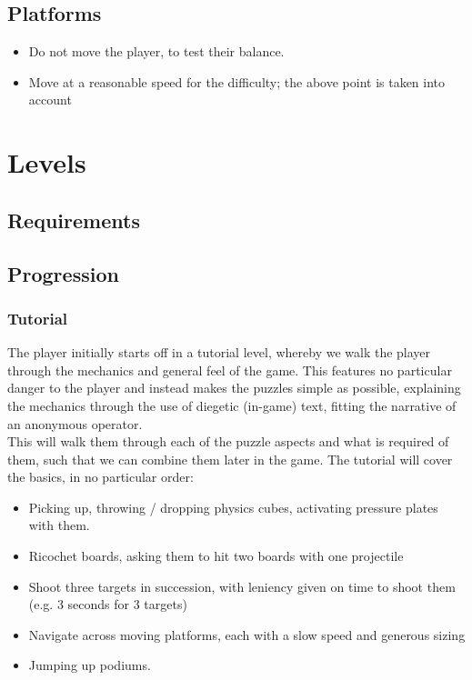 \documentclass[11pt]{article}
\begin{document}
\subsection{Platforms}
\begin{itemize}
	\item Do not move the player, to test their balance.
	\item Move at a reasonable speed for the difficulty; the above point is taken into account	
\end{itemize}


\section{Levels}

\subsection{Requirements}

\subsection{Progression}

\subsubsection{Tutorial}
The player initially starts off in a tutorial level, whereby we walk the player through the mechanics and general feel of the game. This features no particular danger to the player and instead makes the puzzles simple as possible, explaining the mechanics through the use of diegetic (in-game) text, fitting the narrative of an anonymous operator. \\

This will walk them through each of the puzzle aspects and what is required of them, such that we can combine them later in the game. The tutorial will cover the basics, in no particular order: \\

\begin{itemize}
	\item Picking up, throwing / dropping physics cubes, activating pressure plates with them.
	\item Ricochet boards, asking them to hit two boards with one projectile 
	\item Shoot three targets in succession, with leniency given on time to shoot them (e.g. 3 seconds for 3 targets)
	\item Navigate across moving platforms, each with a slow speed and generous sizing
	\item Jumping up podiums.
\end{itemize}
\end{document}
